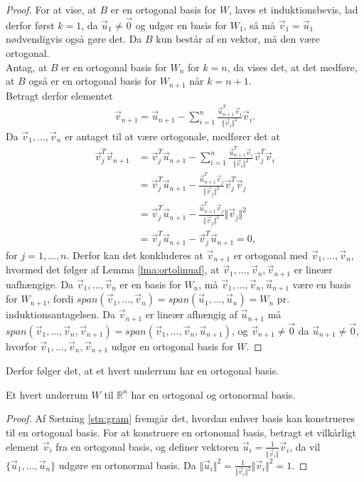\begin{proof}
For at  vise, at $B$ er en ortogonal basis for $W$, laves et induktionsbevis, lad derfor først $k= 1$, da $\vec{u}_1\neq \vec{0}$ og udgør en basis for $W_1$, så må $\vec{v}_1 = \vec{u}_1$ nødvendigvis også gøre det.
Da $B$ kun består af en vektor, må den være ortogonal.
\\Antag, at $B$ er en ortogonal basis for $W_n$ for $k=n$, da vises det, at det medføre, at $B$ også er en ortogonal basis for  $W_{n+1}$ når $k = n+1$.
\\Betragt derfor elementet 
\begin{align*}
\vec{v}_{n+1} = \vec{u}_{n+1} - \sum_{i=1}^n \frac{\vec{u}_{n+1}^T\vec{v}_i}{\Vert\vec{v}_i\Vert^2}\vec{v}_i.
\end{align*}
Da $\vec{v}_1,...,\vec{v}_n$ er antaget til at være ortogonale, medfører det at
\begin{align*}
\vec{v}_j^T\vec{v}_{n+1} &= \vec{v}_j^T\vec{u}_{n+1} - \sum_{i=1}^n \frac{\vec{u}_{n+1}^T\vec{v}_i}{\Vert\vec{v}_i\Vert^2}\vec{v}_j^T\vec{v}_i
\\ &= \vec{v}_j^T\vec{u}_{n+1} - \frac{\vec{u}_{n+1}^T\vec{v}_j}{\Vert\vec{v}_j\Vert^2}\vec{v}_j^T\vec{v}_j
\\ & = \vec{v}_j^T\vec{u}_{n+1} -  \frac{\vec{u}_{n+1}^T\vec{v}_j}{\Vert\vec{v}_j\Vert^2}\Vert\vec{v}_j\Vert^2
\\ & =\vec{v}_j^T\vec{u}_{n+1} - \vec{v}_j^T\vec{u}_{n+1} = 0 , 
\end{align*}
for $j = 1,...,n$. 
Derfor kan det konkluderes at $\vec{v}_{n+1}$ er ortogonal med $\vec{v}_1,...,\vec{v}_n$, hvormed det følger af Lemma \ref{lma:ortolinuaf}, at $\vec{v}_1,...,\vec{v}_n, \vec{v}_{n+1}$ er lineær uafhængige.
Da $\vec{v}_1,...,\vec{v}_n$ er en basis for $W_n$, må $\vec{v}_1,...,\vec{v}_n, \vec{u}_{n+1}$ være en basis for $W_{n+1}$, fordi $span(\vec{v}_1,...,\vec{v}_n) = span(\vec{u}_1,...,\vec{u}_n) = W_n$ pr. induktionsantagelsen. 
Da $\vec{v}_{n+1}$ er lineær afhængig af $\vec{u}_{n+1}$ må $span(\vec{v}_1,...,\vec{v}_n, \vec{v}_{n+1}) = span(\vec{v}_1,...,\vec{v}_n, \vec{u}_{n+1})$, og $\vec{v}_{n+1} \neq \vec{0}$ da $\vec{u}_{n+1} \neq \vec{0}$, hvorfor $\vec{v}_1,...,\vec{v}_n, \vec{v}_{n+1}$ udgør en ortogonal basis for $W$.
\end{proof}
Derfor følger det, at et hvert underrum har en ortogonal basis.
\begin{kor}
Et hvert underrum $W$ til $\mathds{R}^n$ har en ortogonal og ortonormal basis.
\end{kor}
\begin{proof}
Af Sætning \ref{stn:gram} fremgår det, hvordan enhver basis kan konstrueres til en ortogonal basis. 
For at konstruere en ortonomal basis, betragt et vilkårligt element $\vec{v}_i$ fra en ortogonal basis, og definer vektoren $\vec{u}_i = \frac{1}{\Vert\vec{v}_i\Vert}\vec{v}_i$, da vil $\{\vec{u}_1,...,\vec{u}_n\}$ udgøre en ortonormal basis. 
Da $\Vert\vec{u}_i\Vert^2 = \frac{1}{\Vert\vec{v}_i\Vert^2}\Vert\vec{v}_i\Vert^2 = 1$.
\end{proof}



 